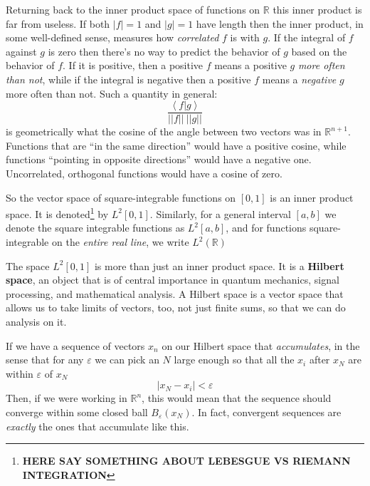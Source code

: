 	Returning back to the inner product space of functions on $\mathbb R$ this inner product is far from useless. If both $|f|=1$ and $|g|=1$ have length then the inner product, in some well-defined sense, measures how \emph{correlated} $f$ is with $g$. If the integral of $f$ against $g$ is zero then there's no way to predict the behavior of $g$ based on the behavior of $f$. If it is positive, then a positive $f$ means a positive $g$ \emph{more often than not}, while if the integral is negative then a positive $f$ means a \emph{negative} $g$ more often than not. Such a quantity in general: 
	\begin{equation*}
		\frac{\left< f | g \right>}{||f|| ~ ||g||}
	\end{equation*}
	is geometrically what the cosine of the angle between two vectors was in $\mathbb R^{n+1}$. Functions that are ``in the same direction'' would have a positive cosine, while functions ``pointing in opposite directions'' would have a negative one. Uncorrelated, orthogonal functions would have a cosine of zero.
	
	So the vector space of square-integrable functions on $[0,1]$ is an inner product space. It is denoted\footnote{\textbf{HERE SAY SOMETHING ABOUT LEBESGUE VS RIEMANN INTEGRATION}} by $L^2[0,1]$. Similarly, for a general interval $[a,b]$ we denote the square integrable functions as $L^2 [a,b]$, and for functions square-integrable on the \emph{entire real line}, we write $L^2 (\mathbb R)$
	
	The space $L^2[0,1]$ is more than just an inner product space. It is a \textbf{Hilbert space}, an object that is of central importance in quantum mechanics, signal processing, and mathematical analysis. A Hilbert space is a vector space that allows us to take limits of vectors, too, not just finite sums, so that we can do analysis on it.
	
	If we have a sequence of vectors $x_n$ on our Hilbert space that \emph{accumulates}, in the sense that for any $\varepsilon$ we can pick an $N$ large enough so that all the $x_i$ after $x_N$ are within $\varepsilon$ of $x_N$
	\begin{equation}
		|x_N - x_i| < \varepsilon
	\end{equation}
	Then, if we were working in $\mathbb R^n$, this would mean that the sequence should converge within some closed ball $B_{\varepsilon}(x_N)$. In fact, convergent sequences are \emph{exactly} the ones that accumulate like this. 
	
